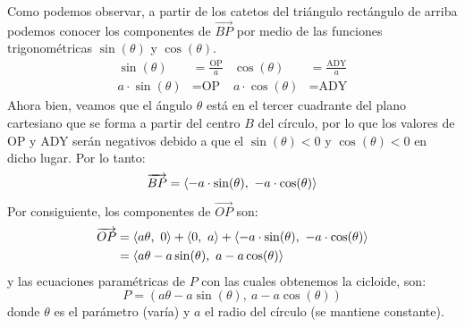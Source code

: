 \documentclass[12pt]{article}
\begin{document}
\begin{figure}[hbt!]
\centering


\end{figure}

Como podemos observar, a partir de los catetos del triángulo rectángulo de arriba podemos conocer los componentes de $\overrightarrow{BP}$ por medio de las funciones trigonométricas $\sin(\theta)$ y $\cos(\theta)$.
\begin{align*}
  \sin(\theta) &= \frac{\text{OP}}{a} & \cos(\theta) &= \frac{\text{ADY}}{a} \\
  a \cdot \sin(\theta) &= \text{OP} & a \cdot \cos(\theta) &= \text{ADY}
\end{align*}
Ahora bien, veamos que el ángulo $\theta$ está en el tercer cuadrante del plano cartesiano que se forma a partir del centro $B$ del círculo, por lo que los valores de OP y ADY serán negativos debido a que el $\sin(\theta) < 0$ y $\cos(\theta) < 0$ en dicho lugar. Por lo tanto:
\[
  \overrightarrow{BP} = \langle -a \cdot \sin(\theta), \ -a \cdot \cos(\theta) \rangle
\]
Por consiguiente, los componentes de $\overrightarrow{OP}$ son:
\begin{align*}
  \overrightarrow{OP} &= \langle a \theta, \ 0 \rangle + \langle 0, \ a \rangle + \langle -a \cdot \sin(\theta), \ -a \cdot \cos(\theta) \rangle \\
               &= \langle a \theta - a \sin(\theta), \ a - a \cos(\theta) \rangle
\end{align*}
y las ecuaciones paramétricas de $P$ con las cuales obtenemos la cicloide, son:
\[
  P = (a \theta - a \sin(\theta), \ a - a \cos(\theta))
\]
donde $\theta$ es el parámetro (varía) y $a$ el radio del círculo (se mantiene constante).
\end{document}
